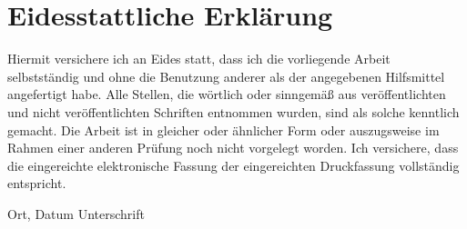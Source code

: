 \documentclass[12pt,a4paper,oneside,hyphens]{article}
\begin{document}


\newpage
\listoffigures
\newpage
\listoftables
\newpage
\listoflistings
\newpage

\newpage






\newpage




\newpage
{}
\section*{Eidesstattliche Erklärung}

\noindent Hiermit versichere ich an Eides statt, dass ich die vorliegende Arbeit selbst\-ständig und ohne die Benutzung
anderer als der angegebenen Hilfsmittel angefertigt habe. Alle Stellen, die wörtlich oder sinngemäß aus
veröffentlichten und nicht veröffentlichten Schriften entnommen wurden, sind als solche kenntlich gemacht. Die Arbeit ist
in gleicher oder ähnlicher Form oder auszugsweise im Rahmen einer anderen Prüfung noch nicht vorgelegt worden. Ich
versichere, dass die eingereichte elektronische Fassung der eingereichten Druckfassung vollständig entspricht.

\vspace{2cm}
\hspace{2cm} Ort, Datum \hfill Unterschrift \hspace{2cm}
\end{document}
